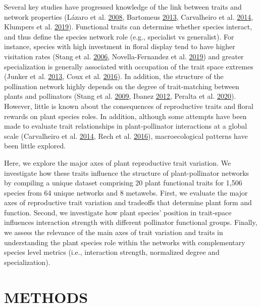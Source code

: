\documentclass[11pt,a4paper,]{article}
\begin{document}
Several key studies have progressed knowledge of the link between traits
and network properties (Lázaro et al.
\protect\hyperlink{ref-lazaro2008}{2008}, Bartomeus
\protect\hyperlink{ref-bartomeus2013}{2013}, Carvalheiro et al.
\protect\hyperlink{ref-carvalheiro2014}{2014}, Klumpers et al.
\protect\hyperlink{ref-klumpers2019}{2019}). Functional traits can
determine whether species interact, and thus define the species network
role (e.g., specialist vs generalist). For instance, species with high
investment in floral display tend to have higher visitation rates (Stang
et al. \protect\hyperlink{ref-stang2006}{2006}, Novella-Fernandez et al.
\protect\hyperlink{ref-novella-fernandez2019}{2019}) and greater
specialization is generally associated with occupation of the trait
space extremes (Junker et al. \protect\hyperlink{ref-junker2013}{2013},
Coux et al. \protect\hyperlink{ref-coux2016}{2016}). In addition, the
structure of the pollination network highly depends on the degree of
trait-matching between plants and pollinators (Stang et al.
\protect\hyperlink{ref-stang2009}{2009}, Ibanez
\protect\hyperlink{ref-ibanez2012}{2012}, Peralta et al.
\protect\hyperlink{ref-peralta2020}{2020}). However, little is known
about the consequences of reproductive traits and floral rewards on
plant species roles. In addition, although some attempts have been made
to evaluate trait relationships in plant-pollinator interactions at a
global scale (Carvalheiro et al.
\protect\hyperlink{ref-carvalheiro2014}{2014}, Rech et al.
\protect\hyperlink{ref-rech2016}{2016}), macroecological patterns have
been little explored.

Here, we explore the major axes of plant reproductive trait variation.
We investigate how these traits influence the structure of
plant-pollinator networks by compiling a unique dataset comprising 20
plant functional traits for 1,506 species from 64 unique networks and 8
metawebs. First, we evaluate the major axes of reproductive trait
variation and tradeoffs that determine plant form and function. Second,
we investigate how plant species' position in trait-space influences
interaction strength with different pollinator functional groups.
Finally, we assess the relevance of the main axes of trait variation and
traits in understanding the plant species role within the networks with
complementary species level metrics (i.e., interaction strength,
normalized degree and specialization).

\section{METHODS}\label{methods}
\end{document}
